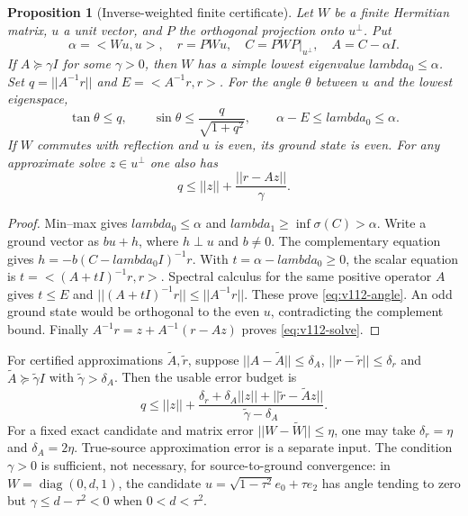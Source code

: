 \documentclass[11pt]{article}
\def\lambda{lambda}%
\def\norm#1{||#1||}%
\def\ip#1#2{<#1,#2>}%
\newtheorem{proposition}[theorem]{Proposition}
\theoremstyle{remark}
\newcommand{\norm}[1]{\left\lVert #1\right\rVert}
\newcommand{\ip}[2]{\left\langle #1,#2\right\rangle}
\begin{document}
\begin{proposition}[Inverse-weighted finite certificate]
\label{prop:v112-schur-angle}
Let $W$ be a finite Hermitian matrix, $u$ a unit vector, and $P$ the
orthogonal projection onto $u^\perp$. Put
\[
 \alpha=\ip{Wu}{u},\quad r=PWu,\quad
 C=PWP|_{u^\perp},\quad A=C-\alpha I.
\]
If $A\succeq\gamma I$ for some $\gamma>0$, then $W$ has a simple
lowest eigenvalue $\lambda_0\le\alpha$. Set
$q=\norm{A^{-1}r}$ and $E=\ip{A^{-1}r}{r}$. For the angle $\theta$
between $u$ and the lowest eigenspace,
\begin{equation}\label{eq:v112-angle}
 \tan\theta\le q,\qquad
 \sin\theta\le\frac{q}{\sqrt{1+q^2}},\qquad
 \alpha-E\le\lambda_0\le\alpha.
\end{equation}
If $W$ commutes with reflection and $u$ is even, its ground state is even.
For any approximate solve $z\in u^\perp$ one also has
\begin{equation}\label{eq:v112-solve}
 q\le\norm z+\frac{\norm{r-Az}}{\gamma}.
\end{equation}
\end{proposition}
\begin{proof}
Min--max gives $\lambda_0\le\alpha$ and
$\lambda_1\ge\inf\sigma(C)>\alpha$. Write a ground vector as $bu+h$,
where $h\perp u$ and $b\ne0$. The complementary equation gives
$h=-b(C-\lambda_0 I)^{-1}r$. With $t=\alpha-\lambda_0\ge0$, the
scalar equation is $t=\ip{(A+tI)^{-1}r}{r}$. Spectral calculus for
the same positive operator $A$ gives $t\le E$ and
$\norm{(A+tI)^{-1}r}\le\norm{A^{-1}r}$. These prove
\eqref{eq:v112-angle}. An odd ground state would be orthogonal to the
even $u$, contradicting the complement bound. Finally
$A^{-1}r=z+A^{-1}(r-Az)$ proves \eqref{eq:v112-solve}.
\end{proof}

For certified approximations $\widetilde A,\widetilde r$, suppose
$\norm{A-\widetilde A}\le\delta_A$,
$\norm{r-\widetilde r}\le\delta_r$ and
$\widetilde A\succeq\widetilde\gamma I$ with
$\widetilde\gamma>\delta_A$. Then the usable error budget is
\[
 q\le\norm z+
 \frac{\delta_r+\delta_A\norm z+
       \norm{\widetilde r-\widetilde A z}}
      {\widetilde\gamma-\delta_A}.
\]
For a fixed exact candidate and matrix error $\norm{W-\widetilde W}\le\eta$,
one may take $\delta_r=\eta$ and $\delta_A=2\eta$.
True-source approximation error is a separate input. The condition
$\gamma>0$ is sufficient, not necessary, for source-to-ground
convergence: in $W=\operatorname{diag}(0,d,1)$, the candidate
$u=\sqrt{1-\tau^2}e_0+\tau e_2$ has angle tending to zero but
$\gamma\le d-\tau^2<0$ when $0<d<\tau^2$.
\end{document}
